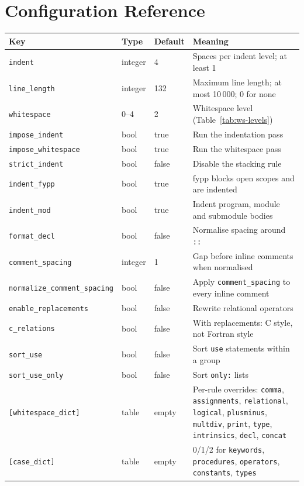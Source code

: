 \documentclass[11pt,a4paper,openany]{book}
\newcommand{\code}[1]{\texttt{\small #1}}
\begin{document}
\chapter{Configuration Reference}\label{app:config}

\begin{center}
\small
\begin{tabularx}{\linewidth}{@{}l l l X@{}}
\toprule
Key & Type & Default & Meaning\\
\midrule
\code{indent} & integer & 4 & Spaces per indent level; at least 1\\
\code{line\_length} & integer & 132 & Maximum line length; at most 10\,000; 0 for none\\
\code{whitespace} & 0--4 & 2 & Whitespace level (Table~\ref{tab:ws-levels})\\
\code{impose\_indent} & bool & true & Run the indentation pass\\
\code{impose\_whitespace} & bool & true & Run the whitespace pass\\
\code{strict\_indent} & bool & false & Disable the stacking rule\\
\code{indent\_fypp} & bool & true & fypp blocks open scopes and are indented\\
\code{indent\_mod} & bool & true & Indent program, module and submodule bodies\\
\code{format\_decl} & bool & false & Normalise spacing around \code{::}\\
\code{comment\_spacing} & integer & 1 & Gap before inline comments when normalised\\
\code{normalize\_comment\_spacing} & bool & false & Apply \code{comment\_spacing} to every inline comment\\
\code{enable\_replacements} & bool & false & Rewrite relational operators\\
\code{c\_relations} & bool & false & With replacements: C style, not Fortran style\\
\code{sort\_use} & bool & false & Sort \code{use} statements within a group\\
\code{sort\_use\_only} & bool & false & Sort \code{only:} lists\\
\code{[whitespace\_dict]} & table & empty & Per-rule overrides: \code{comma}, \code{assignments}, \code{relational}, \code{logical}, \code{plusminus}, \code{multdiv}, \code{print}, \code{type}, \code{intrinsics}, \code{decl}, \code{concat}\\
\code{[case\_dict]} & table & empty & 0/1/2 for \code{keywords}, \code{procedures}, \code{operators}, \code{constants}, \code{types}\\
\bottomrule
\end{tabularx}
\end{center}
\end{document}
